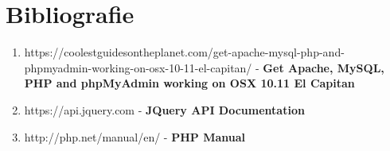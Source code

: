 \documentclass[12pt]{article}
\begin{document}
\section*{Bibliografie}
\begin{enumerate}
\item https://coolestguidesontheplanet.com/get-apache-mysql-php-and-phpmyadmin-working-on-osx-10-11-el-capitan/ - \textbf{Get Apache, MySQL, PHP and phpMyAdmin working on OSX 10.11 El Capitan}
\item https://api.jquery.com - \textbf{JQuery API Documentation}
\item http://php.net/manual/en/ - \textbf{PHP Manual}
\end{enumerate}
\end{document}
